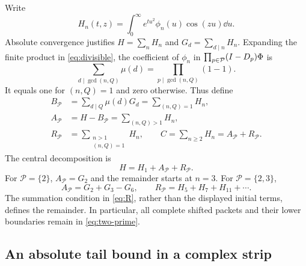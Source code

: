 Write
\begin{equation}\label{eq:Hn}
 H_n(t,z)=\int_0^\infty e^{tu^2}\phi_n(u)\cos(zu)\dd u.
\end{equation}
Absolute convergence justifies $H=\sum_nH_n$ and
$G_d=\sum_{d\mid n}H_n$. Expanding the finite product in
\eqref{eq:divisible}, the coefficient of $\phi_n$ in
$\prod_{p\in\mathcal P}(I-D_p)\Phi$ is
\[
 \sum_{d\mid\gcd(n,Q)}\mu(d)
 =\prod_{p\mid\gcd(n,Q)}(1-1).
\]
It equals one for $(n,Q)=1$ and zero otherwise. Thus define
\begin{align}
 B_{\mathcal P}&=\sum_{d\mid Q}\mu(d)G_d
                =\sum_{(n,Q)=1}H_n,\label{eq:B}\\
 A_{\mathcal P}&=H-B_{\mathcal P}
                =\sum_{(n,Q)>1}H_n,\label{eq:A}\\
 R_{\mathcal P}&=\sum_{\substack{n>1\\(n,Q)=1}}H_n,
 \qquad C=\sum_{n\ge2}H_n=A_{\mathcal P}+R_{\mathcal P}.\label{eq:R}
\end{align}
The central decomposition is
\begin{equation}\label{eq:decomposition}
 H=H_1+A_{\mathcal P}+R_{\mathcal P}.
\end{equation}
For $\mathcal P=\{2\}$, $A_{\mathcal P}=G_2$ and the remainder starts
at $n=3$. For $\mathcal P=\{2,3\}$,
\begin{equation}\label{eq:two-prime}
 A_{\mathcal P}=G_2+G_3-G_6,
 \qquad R_{\mathcal P}=H_5+H_7+H_{11}+\cdots.
\end{equation}
The summation condition in \eqref{eq:R}, rather than the displayed initial
terms, defines the remainder. In particular, all complete shifted packets
and their lower boundaries remain in \eqref{eq:two-prime}.

\subsection{An absolute tail bound in a complex strip}

